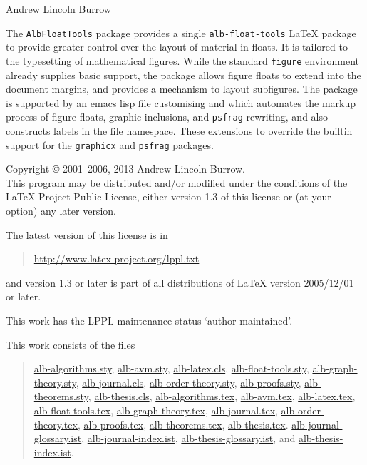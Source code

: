 \documentclass[11pt,a4paper,oneside,titlepage]{alb-latex}
\begin{document}


\begin{albTitlePage}


  Andrew Lincoln Burrow


  The \texttt{AlbFloatTools} package provides a single
  \texttt{alb-float-tools} \LaTeX{} package to provide greater control
  over the layout of material in floats.  It is tailored to the
  typesetting of mathematical figures.  While the standard
  \texttt{figure} environment already supplies basic support, the
  package allows figure floats to extend into the document margins, and
  provides a mechanism to layout subfigures.  The package is supported
  by an emacs lisp file customising \AUCTeX{} and \RefTeX{} which
  automates the markup process of figure floats, graphic inclusions, and
  \texttt{psfrag} rewriting, and also constructs labels in the file
  namespace.  These extensions to \AUCTeX{} override the builtin support
  for the \texttt{graphicx} and \texttt{psfrag} packages.



  Copyright \copyright{} 2001--2006, 2013 Andrew Lincoln Burrow.\\
  This program may be distributed and/or modified under the conditions
  of the \LaTeX{} Project Public License, either version 1.3 of this
  license or (at your option) any later version.

  \medskip{}

  The latest version of this license is in
  \begin{quote}
    \url{http://www.latex-project.org/lppl.txt}
  \end{quote}
  and version 1.3 or later is part of all distributions of LaTeX version
  2005/12/01 or later.

  \medskip{}

  This work has the LPPL maintenance status `author-maintained'.

  \medskip{}

  This work consists of the files
  \begin{quote}
    \begin{flushleft}
      \url{alb-algorithms.sty}, \url{alb-avm.sty}, \url{alb-latex.cls},
      \url{alb-float-tools.sty}, \url{alb-graph-theory.sty},
      \url{alb-journal.cls}, \url{alb-order-theory.sty},
      \url{alb-proofs.sty}, \url{alb-theorems.sty},
      \url{alb-thesis.cls}, \url{alb-algorithms.tex}, \url{alb-avm.tex},
      \url{alb-latex.tex}, \url{alb-float-tools.tex},
      \url{alb-graph-theory.tex}, \url{alb-journal.tex},
      \url{alb-order-theory.tex}, \url{alb-proofs.tex},
      \url{alb-theorems.tex}, \url{alb-thesis.tex}.
      \url{alb-journal-glossary.ist}, \url{alb-journal-index.ist},
      \url{alb-thesis-glossary.ist}, and \url{alb-thesis-index.ist}.
    \end{flushleft}
  \end{quote}



\end{albTitlePage}
\end{document}
